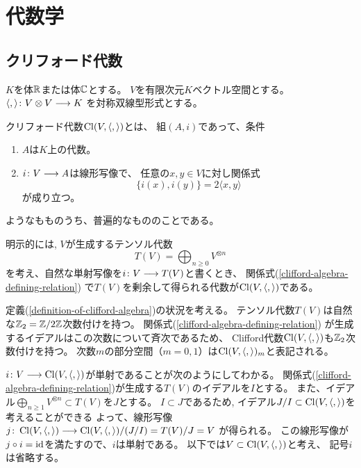 \section{代数学}

\subsection{クリフォード代数}
$K$を体$\mathbb{R}$または体$\mathbb{C}$とする。
$V$を有限次元$K$ベクトル空間とする。
$\langle,\rangle \colon V \otimes V \longrightarrow K$
を対称双線型形式とする。

\begin{dfn}
  \label{definition-of-clifford-algebra}
   クリフォード代数$\operatorname{Cl}(V,\langle,\rangle)$とは、
   組$(A, i)$であって、条件
   \begin{enumerate}
     \item
     $A$は$K$上の代数。
     \item
     $i \colon V \longrightarrow A$は線形写像で、
     任意の$x, y \in V$に対し関係式
     \begin{equation}
       \label{clifford-algebra-defining-relation}
       \{i(x),i(y)\} = 2\langle x,y\rangle
     \end{equation}
     が成り立つ。
   \end{enumerate}
   ようなもものうち、普遍的なもののことである。

   明示的には, $V$が生成するテンソル代数
   \begin{equation}
     T(V) = \bigoplus_{n\geq 0}V^{\otimes n}
   \end{equation}
   を考え、自然な単射写像を$i \colon V \longrightarrow T(V)$と書くとき、
   関係式(\ref{clifford-algebra-defining-relation})
   で$T(V)$を剰余して得られる代数が$\operatorname{Cl}(V,\langle,\rangle)$である。
\end{dfn}

\begin{rem}
  定義(\ref{definition-of-clifford-algebra})の状況を考える。
  テンソル代数$T(V)$は自然な$\mathbb{Z}_2 = \mathbb{Z}/2\mathbb{Z}$次数付けを持つ。
  関係式(\ref{clifford-algebra-defining-relation})
  が生成するイデアルはこの次数について斉次であるため、
  Clifford代数$\operatorname{Cl}(V,\langle,\rangle)$も$\mathbb{Z}_2$次数付けを持つ。
  次数$m$の部分空間（$m=0,1$）は$\operatorname{Cl}(V,\langle,\rangle)_m$と表記される。
\end{rem}

\begin{rem}
$i \colon V \longrightarrow \operatorname{Cl}(V,\langle,\rangle)$が単射であることが次のようにしてわかる。
関係式(\ref{clifford-algebra-defining-relation})が生成する$T(V)$のイデアルを$I$とする。
また、イデアル$\bigoplus_{n\geq 1}V^{\otimes n} \subset T(V)$を$J$とする。
$I \subset J$であるため, イデアル$J/I \subset \operatorname{Cl}(V,\langle,\rangle)$を考えることができる
よって、線形写像$j\colon\operatorname{Cl}(V,\langle,\rangle) \longrightarrow \operatorname{Cl}(V,\langle,\rangle)/(J/I) = T(V)/J = V$
が得られる。
この線形写像が$j \circ i = \mathrm{id}$を満たすので、$i$は単射である。
以下では$V \subset \operatorname{Cl}(V,\langle,\rangle)$と考え、
記号$i$は省略する。
\end{rem}

